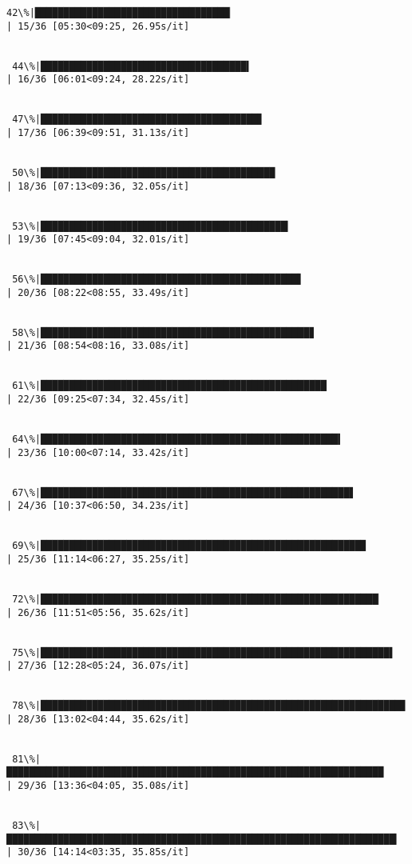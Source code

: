 \documentclass[11pt]{article}
\begin{document}
\begin{Verbatim}[commandchars=\\\{\}]
 42\%|██████████████████████████████████▏                                               | 15/36 [05:30<09:25, 26.95s/it]


 44\%|████████████████████████████████████▍                                             | 16/36 [06:01<09:24, 28.22s/it]


 47\%|██████████████████████████████████████▋                                           | 17/36 [06:39<09:51, 31.13s/it]


 50\%|█████████████████████████████████████████                                         | 18/36 [07:13<09:36, 32.05s/it]


 53\%|███████████████████████████████████████████▎                                      | 19/36 [07:45<09:04, 32.01s/it]


 56\%|█████████████████████████████████████████████▌                                    | 20/36 [08:22<08:55, 33.49s/it]


 58\%|███████████████████████████████████████████████▊                                  | 21/36 [08:54<08:16, 33.08s/it]


 61\%|██████████████████████████████████████████████████                                | 22/36 [09:25<07:34, 32.45s/it]


 64\%|████████████████████████████████████████████████████▍                             | 23/36 [10:00<07:14, 33.42s/it]


 67\%|██████████████████████████████████████████████████████▋                           | 24/36 [10:37<06:50, 34.23s/it]


 69\%|████████████████████████████████████████████████████████▉                         | 25/36 [11:14<06:27, 35.25s/it]


 72\%|███████████████████████████████████████████████████████████▏                      | 26/36 [11:51<05:56, 35.62s/it]


 75\%|█████████████████████████████████████████████████████████████▌                    | 27/36 [12:28<05:24, 36.07s/it]


 78\%|███████████████████████████████████████████████████████████████▊                  | 28/36 [13:02<04:44, 35.62s/it]


 81\%|██████████████████████████████████████████████████████████████████                | 29/36 [13:36<04:05, 35.08s/it]


 83\%|████████████████████████████████████████████████████████████████████▎             | 30/36 [14:14<03:35, 35.85s/it]



\end{Verbatim}
\end{document}
